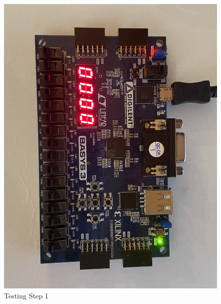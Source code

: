 \documentclass[11pt]{article}
\begin{document}
\begin{figure}[ht]\centering
	\includegraphics[angle=0, width=1.0\textwidth]{IMG_6746.jpg}
	\caption{Testing Step 1}
	\label{fig:sim_with_table}
\end{figure}
\clearpage
\end{document}
